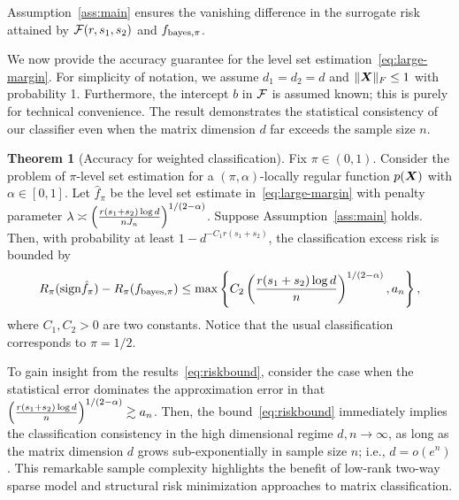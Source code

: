 \documentclass[11pt]{article}
\theoremstyle{definition}
\newtheorem{thm}{Theorem}[section]
\def\sign{\textup{sign}}
\def\bayesf{f_{\textup{bayes}}}
\def\bayespif{f_{\textup{bayes},\pi}}
\begin{document}
Assumption~\ref{ass:main} ensures the vanishing difference in the surrogate risk attained by $\mathcal{F}(r,s_1,s_2)$ and  $\bayespif$. 

We now provide the accuracy guarantee for the level set estimation~\eqref{eq:large-margin}. For simplicity of notation, we assume $d_1=d_2=d$ and $\lVert\bm X\rVert_F\leq 1$ with probability 1. Furthermore, the intercept $b$ in $\mathcal{F}$ is assumed known; this is purely for technical convenience. The result demonstrates the statistical consistency of our classifier even when the matrix dimension $d$ far exceeds the sample size $n$. 

\begin{thm}[Accuracy for weighted classification]\label{thm:main} Fix $\pi\in(0,1)$. Consider the problem of $\pi$-level set estimation for a  $(\pi,\alpha)$-locally regular function $p(\bm X)$ with $\alpha\in[0,1]$. Let $\hat f_\pi$ be the level set estimate in~\eqref{eq:large-margin} with penalty parameter $\lambda\asymp \left( r(s_1+s_2)\log d \over  nJ_n\right)^{1/(2-\alpha)}$. Suppose Assumption~\ref{ass:main} holds. Then, with probability at least $1-d^{-C_1r(s_1+s_2)}$, the classification excess risk is bounded by 
\begin{equation}\label{eq:riskbound}
 R_{\pi}(\sign \hat f_\pi)-R_{\pi}(\bayespif) \leq \max\left\{ C_2\left({r(s_1+s_2)\log d \over n}\right)^{1/(2-\alpha)}, a_n\right\},
\end{equation}
where $C_1,C_2>0$ are two constants. Notice that the usual classification corresponds to $\pi = 1/2$. 
\end{thm}

To gain insight from the results~\eqref{eq:riskbound}, consider the case when the statistical error dominates the approximation error in that $ \left({r(s_1+s_2)\log d \over n}\right)^{1/(2-\alpha)}\gtrsim a_n$. Then, the bound~\eqref{eq:riskbound} immediately implies the classification consistency in the high dimensional regime $d,n\to \infty$, as long as the matrix dimension $d$ grows sub-exponentially in sample size $n$; i.e., $d=o(e^n)$. This remarkable sample complexity highlights the benefit of low-rank two-way sparse model and structural risk minimization approaches to matrix classification. 
\end{document}

